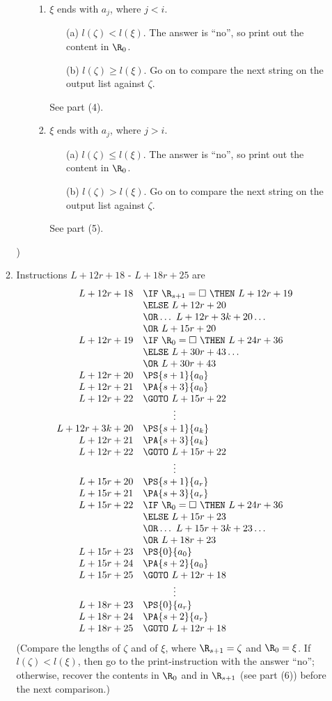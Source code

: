 \begin{enumerate}[1.]
\begin{enumerate}[(1)]
\begin{enumerate}[1)]
\begin{enumerate}[1$^\circ$]
\item $\xi$ ends with $a_j$, where $j < i$.
\begin{itemize}
\item[(a)] $l(\zeta) < l(\xi)$. The answer is ``no'', so print out the content in $\R_0$.
\item[(b)] $l(\zeta) \geq l(\xi)$. Go on to compare the next string on the output list against $\zeta$.
\end{itemize}
See part (4).
\item $\xi$ ends with $a_j$, where $j > i$.
\begin{itemize}
\item[(a)] $l(\zeta) \leq l(\xi)$. The answer is ``no'', so print out the content in $\R_0$.
\item[(b)] $l(\zeta) > l(\xi)$. Go on to compare the next string on the output list against $\zeta$.
\end{itemize}
See part (5).
\end{enumerate}
\end{enumerate})
\item Instructions $L + 12r + 18$ - $L + 18r + 25$ are
\[
\begin{array}{rl}
L + 12r + 18 & \IF \ \R_{s + 1} = \Box \ \THEN \ L + 12r + 19 \cr
\ & \ELSE \ L + 12r + 20 \cr
\ & \OR \ldots \ L + 12r + 3k + 20 \ldots \cr
\ & \OR \ L + 15r + 20 \cr
L + 12r + 19 & \IF \ \R_0 = \Box \ \THEN \ L + 24r + 36 \cr
\ & \ELSE \ L + 30r + 43 \ldots \cr
\ & \OR \ L + 30r + 43 \cr
L + 12r + 20 & \PS{s + 1}{a_0} \cr
L + 12r + 21 & \PA{s + 3}{a_0} \cr
L + 12r + 22 & \GOTO \ L + 15r + 22 \cr
\multicolumn{2}{c}{\vdots} \cr
L + 12r + 3k + 20 & \PS{s + 1}{a_k} \cr
L + 12r + 21 & \PA{s + 3}{a_k} \cr
L + 12r + 22 & \GOTO \ L + 15r + 22 \cr
\multicolumn{2}{c}{\vdots} \cr
L + 15r + 20 & \PS{s + 1}{a_r} \cr
L + 15r + 21 & \PA{s + 3}{a_r} \cr
L + 15r + 22 & \IF \ \R_0 = \Box \ \THEN \ L + 24r + 36 \cr
\ & \ELSE \ L + 15r + 23 \cr
\ & \OR \ldots \ L + 15r + 3k + 23 \ldots \cr
\ & \OR \ L + 18r + 23 \cr
L + 15r + 23 & \PS{0}{a_0} \cr
L + 15r + 24 & \PA{s + 2}{a_0} \cr
L + 15r + 25 & \GOTO \ L + 12r + 18 \cr
\multicolumn{2}{c}{\vdots} \cr
L + 18r + 23 & \PS{0}{a_r} \cr
L + 18r + 24 & \PA{s + 2}{a_r} \cr
L + 18r + 25 & \GOTO \ L + 12r + 18 \cr
\end{array}
\]
(Compare the lengths of $\zeta$ and of $\xi$, where $\R_{s + 1} = \zeta$ and $\R_0 = \xi$. If $l(\zeta) < l(\xi)$, then go to the print-instruction with the answer ``no''; otherwise, recover the contents in $\R_0$ and in $\R_{s + 1}$ (see part (6)) before the next comparison.)

\end{enumerate}
\end{enumerate}
